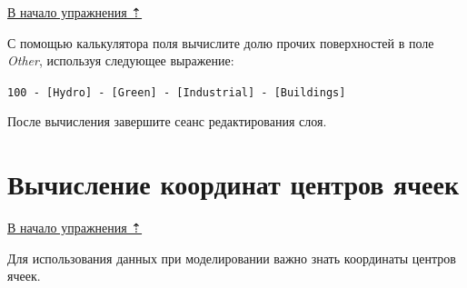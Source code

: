 \documentclass[12pt,]{book}
\begin{document}
\protect\hyperlink{land-cover-hydro}{В начало упражнения ⇡}

С помощью калькулятора поля вычислите долю прочих поверхностей в поле \emph{Other}, используя следующее выражение:

\texttt{100\ -\ {[}Hydro{]}\ -\ {[}Green{]}\ -\ {[}Industrial{]}\ -\ {[}Buildings{]}}

После вычисления завершите сеанс редактирования слоя.

\hypertarget{land-cover-hydro-other-centers}{%
\section{Вычисление координат центров ячеек}\label{land-cover-hydro-other-centers}}

\protect\hyperlink{land-cover-hydro}{В начало упражнения ⇡}

Для использования данных при моделировании важно знать координаты центров ячеек.
\end{document}
